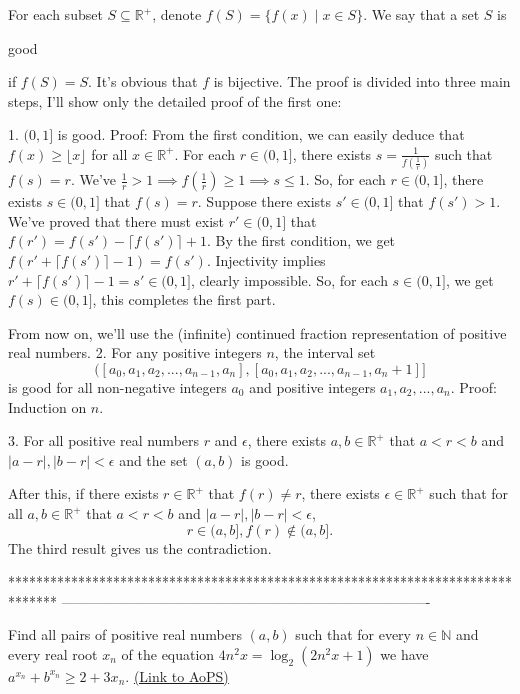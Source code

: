 \begin{mysolution}
	For each subset $S\subseteq \mathbb{R}^+$, denote $f(S)=\{ f(x)\mid x\in S\}$. We say that a set $S$ is \begin{italicized}good \end{italicized} if $f(S)=S$.
It's obvious that $f$ is bijective.
The proof is divided into three main steps, I'll show only the detailed proof of the first one:

1. $(0,1]$ is good.
Proof: From the first condition, we can easily deduce that $f(x)\geq \lfloor x\rfloor$ for all $x\in \mathbb{R}^+$.
For each $r\in (0,1]$, there exists $s=\frac{1}{f(\frac{1}{r})}$ such that $f(s)=r$. We've $\frac{1}{r}>1\implies f(\frac{1}{r})\geq 1\implies s\leq 1$.
So, for each $r\in (0,1]$, there exists $s\in (0,1]$ that $f(s)=r$.
Suppose there exists $s'\in (0,1]$ that $f(s')>1$.
We've proved that there must exist $r'\in (0,1]$ that $f(r')=f(s')-\lceil f(s')\rceil +1$.
By the first condition, we get $f(r'+\lceil f(s')\rceil -1)=f(s')$. Injectivity implies $r'+\lceil f(s')\rceil -1 =s'\in (0,1]$, clearly impossible.
So, for each $s\in (0,1]$, we get $f(s)\in (0,1]$, this completes the first part.

From now on, we'll use the (infinite) continued fraction representation of positive real numbers.
2. For any positive integers $n$, the interval set
$$\Big([a_0,a_1,a_2,...,a_{n-1},a_n],[a_0,a_1,a_2,...,a_{n-1},a_n+1]\Big]$$ is good for all non-negative integers $a_0$ and positive integers $a_1,a_2,...,a_n$.
Proof: Induction on $n$.

3. For all positive real numbers $r$ and $\epsilon$, there exists $a,b \in \mathbb{R}^+$ that $a<r<b$ and $|a-r|,|b-r|<\epsilon$ and the set $(a,b)$ is good.

After this, if there exists $r\in \mathbb{R}^+$ that $f(r)\neq r$, there exists $\epsilon \in \mathbb{R}^+$ such that for all $a,b\in \mathbb{R}^+$ that $a<r<b$ and $|a-r|,|b-r|<\epsilon$,
$$r\in (a,b],f(r)\not\in (a,b].$$
The third result gives us the contradiction.
\end{mysolution}
*******************************************************************************
-------------------------------------------------------------------------------

\begin{problem}
	Find all pairs of positive real numbers $(a, b)$ such that for every $n \in\mathbb{N}$ and every real root $x_{n}$ of the equation $4n^{2}x = \log_{2}(2n^{2}x+1)$ we have $a^{x_{n}}+b^{x_{n}}\geq 2+3x_{n}.$
	\flushright \href{https://artofproblemsolving.com/community/c6h140931}{(Link to AoPS)}
\end{problem}



